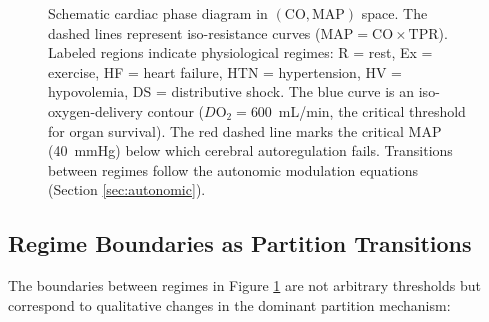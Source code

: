 \documentclass[10pt,twocolumn,a4paper]{article}
\theoremstyle{remark}
\newcommand{\CO}{\mathrm{CO}}
\newcommand{\MAP}{\mathrm{MAP}}
\newcommand{\TPR}{\mathrm{TPR}}
\begin{document}
\begin{figure}[h]
\caption{Schematic cardiac phase diagram in $(\CO, \MAP)$ space. The dashed lines represent iso-resistance curves ($\MAP = \CO \times \TPR$). Labeled regions indicate physiological regimes: R = rest, Ex = exercise, HF = heart failure, HTN = hypertension, HV = hypovolemia, DS = distributive shock. The blue curve is an iso-oxygen-delivery contour ($D\mathrm{O}_2 = 600$~mL/min, the critical threshold for organ survival). The red dashed line marks the critical MAP (40~mmHg) below which cerebral autoregulation fails. Transitions between regimes follow the autonomic modulation equations (Section \ref{sec:autonomic}).}
\label{fig:phase_diagram_schematic}
\end{figure}

\subsection{Regime Boundaries as Partition Transitions}

The boundaries between regimes in Figure \ref{fig:phase_diagram_schematic} are not arbitrary thresholds but correspond to qualitative changes in the dominant partition mechanism:
\end{document}
